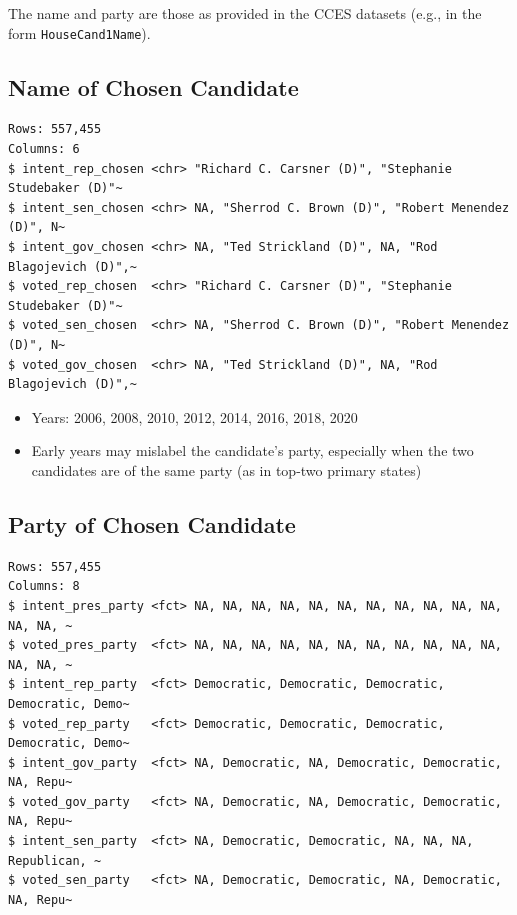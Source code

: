 \documentclass[10pt,article,oneside]{memoir}
\theoremstyle{definition}
\begin{document}
The name and party are those as provided in the CCES datasets (e.g., in
the form \texttt{HouseCand1Name}).

\hypertarget{name-of-chosen-candidate}{%
\subsection{Name of Chosen Candidate}\label{name-of-chosen-candidate}}

\begin{verbatim}
Rows: 557,455
Columns: 6
$ intent_rep_chosen <chr> "Richard C. Carsner (D)", "Stephanie Studebaker (D)"~
$ intent_sen_chosen <chr> NA, "Sherrod C. Brown (D)", "Robert Menendez (D)", N~
$ intent_gov_chosen <chr> NA, "Ted Strickland (D)", NA, "Rod Blagojevich (D)",~
$ voted_rep_chosen  <chr> "Richard C. Carsner (D)", "Stephanie Studebaker (D)"~
$ voted_sen_chosen  <chr> NA, "Sherrod C. Brown (D)", "Robert Menendez (D)", N~
$ voted_gov_chosen  <chr> NA, "Ted Strickland (D)", NA, "Rod Blagojevich (D)",~
\end{verbatim}

\begin{itemize}
\tightlist
\item
  Years: 2006, 2008, 2010, 2012, 2014, 2016, 2018, 2020
\item
  Early years may mislabel the candidate's party, especially when the
  two candidates are of the same party (as in top-two primary states)
\end{itemize}

\hypertarget{party-of-chosen-candidate}{%
\subsection{Party of Chosen Candidate}\label{party-of-chosen-candidate}}

\begin{verbatim}
Rows: 557,455
Columns: 8
$ intent_pres_party <fct> NA, NA, NA, NA, NA, NA, NA, NA, NA, NA, NA, NA, NA, ~
$ voted_pres_party  <fct> NA, NA, NA, NA, NA, NA, NA, NA, NA, NA, NA, NA, NA, ~
$ intent_rep_party  <fct> Democratic, Democratic, Democratic, Democratic, Demo~
$ voted_rep_party   <fct> Democratic, Democratic, Democratic, Democratic, Demo~
$ intent_gov_party  <fct> NA, Democratic, NA, Democratic, Democratic, NA, Repu~
$ voted_gov_party   <fct> NA, Democratic, NA, Democratic, Democratic, NA, Repu~
$ intent_sen_party  <fct> NA, Democratic, Democratic, NA, NA, NA, Republican, ~
$ voted_sen_party   <fct> NA, Democratic, Democratic, NA, Democratic, NA, Repu~
\end{verbatim}
\end{document}
